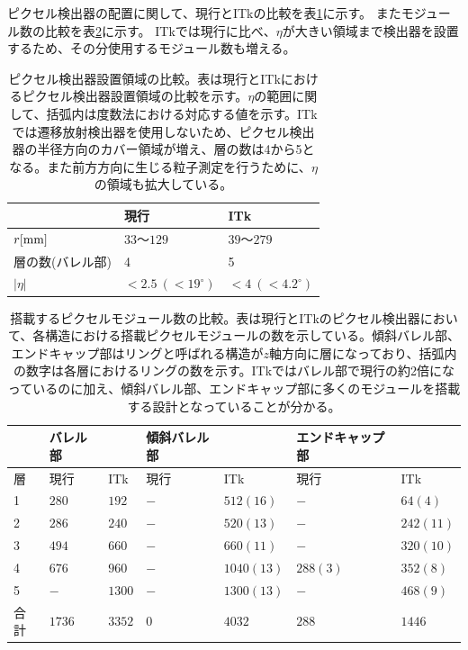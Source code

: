 ピクセル検出器の配置に関して、現行とITkの比較を表\ref{compare_itk_pixel}に示す。
またモジュール数の比較を表\ref{compare_itk_modules}に示す。
ITkでは現行に比べ、$\eta$が大きい領域まで検出器を設置するため、その分使用するモジュール数も増える。

\begin{table}[tbp]
\begin{center}
\caption[ピクセル検出器設置領域の比較]{ピクセル検出器設置領域の比較。表は現行とITkにおけるピクセル検出器設置領域の比較を示す。$\eta$の範囲に関して、括弧内は度数法における対応する値を示す。ITkでは遷移放射検出器を使用しないため、ピクセル検出器の半径方向のカバー領域が増え、層の数は4から5となる。また前方方向に生じる粒子測定を行うために、$\eta$の領域も拡大している。}
\label{compare_itk_pixel}
  \begin{tabular}{|lll|} \hline
    & 現行 & ITk \\ \hline
    $r[\rm{mm}]$ & $33〜129$ & $39〜279$ \\ 
    層の数(バレル部) & 4 & 5 \\ 
    $|\eta|$ & $<2.5~(<19^\circ)$ & $<4~(<4.2^\circ)$ \\ \hline
  \end{tabular}
\end{center}
\end{table}

\begin{table}[tbp]
\begin{center}
\caption[搭載するピクセルモジュール数の比較]{搭載するピクセルモジュール数の比較。表は現行とITkのピクセル検出器において、各構造における搭載ピクセルモジュールの数を示している。傾斜バレル部、エンドキャップ部はリングと呼ばれる構造が$z$軸方向に層になっており、括弧内の数字は各層におけるリングの数を示す。ITkではバレル部で現行の約2倍になっているのに加え、傾斜バレル部、エンドキャップ部に多くのモジュールを搭載する設計となっていることが分かる。}
\label{compare_itk_modules}
  \begin{tabular}{|l||ll|ll|ll|} \hline
          & バレル部 &            & 傾斜バレル部 & & エンドキャップ部 & \\ \hline 
    層    & 現行     & ITk        & 現行& ITk          & 現行     & ITk \\ \hline
    1     & $280$    & $192$      & $-$ & $512(16)$        & $-$      & $64(4)$ \\ 
    2     & $286$    & $240$      & $-$ & $520(13)$        & $-$      & $242(11)$ \\ 
    3     & $494$    & $660$      & $-$ & $660(11)$        & $-$      & $320(10)$ \\ 
    4     & $676$    & $960$      & $-$ & $1040(13)$       & $288(3)$ & $352(8)$ \\ 
    5     & $-$      & $1300$     & $-$ & $1300(13)$       & $-$      & $468(9)$ \\ \hline
    合計  & $1736$   & $3352$     & $0$ & $4032$       & $288$    & $1446$ \\ \hline\hline
  \end{tabular}
\end{center}
\end{table}

